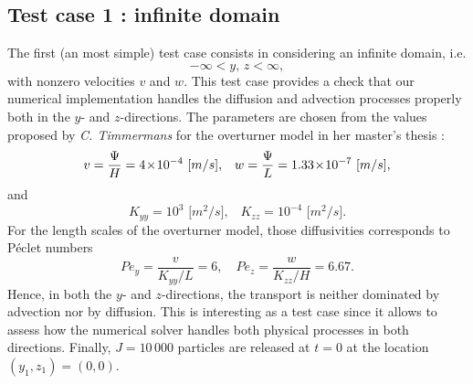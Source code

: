 \subsection{Test case 1 : infinite domain}
The first (an most simple) test case consists in considering an infinite domain, i.e.
\begin{equation} \label{eq:testcase:domain}
	-\infty < y,\, z < \infty,
\end{equation}
with nonzero velocities $v$ and $w$. This test case provides a check that our numerical implementation handles the diffusion and advection processes properly both in the $y$- and $z$-directions. The parameters are chosen from the values proposed by \textit{C. Timmermans} for the overturner model in her master's thesis \cite{timmermans2006masterthesis}:
\begin{equation}
	v = \frac{\Psi}{H} = 4\!\times\!10^{-4}\mbox{ [$m/s$],}\quad  w = \frac{\Psi}{L}=1.33\!\times\!10^{-7}\mbox{ [$m/s$],}
\end{equation}
and
\begin{equation}
	K_{yy} = 10^{3} \mbox{ [$m^2/s$],}\quad K_{zz} = 10^{-4} \mbox{ [$m^2/s$].} 
\end{equation}
For the length scales of the overturner model, those diffusivities corresponds to Péclet numbers
\begin{equation}
	Pe_y = \frac{v}{K_{yy}/L} = 6,\quad Pe_z = \frac{w}{K_{zz}/H} = 6.67.
\end{equation}
Hence, in both the $y$- and $z$-directions, the transport is neither dominated by advection nor by diffusion. This is interesting as a test case since it allows to assess how the numerical solver handles both physical processes in both directions. 
Finally, $J = 10\,000$ particles are released at $t=0$ at the location $(y_1,z_1) = (0,0)$.

